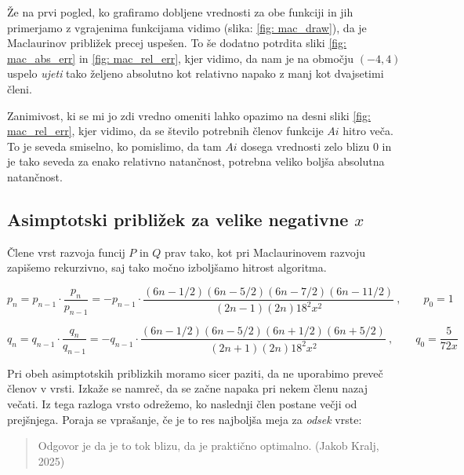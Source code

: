 \documentclass[slovene,11pt,a4paper]{article}
\begin{document}
Že na prvi pogled, ko grafiramo dobljene vrednosti za obe funkciji in jih primerjamo z vgrajenima funkcijama vidimo (slika: \ref{fig: mac_draw}), da je Maclaurinov približek precej uspešen. To še dodatno potrdita sliki \ref{fig: mac_abs_err} in \ref{fig: mac_rel_err}, kjer vidimo, da nam je na območju $(-4, 4)$ uspelo \textit{ujeti} tako željeno absolutno kot relativno napako z manj kot dvajsetimi členi.

Zanimivost, ki se mi jo zdi vredno omeniti lahko opazimo na desni sliki \ref{fig: mac_rel_err}, kjer vidimo, da se število potrebnih členov funkcije $Ai$ hitro veča. To je seveda smiselno, ko pomislimo, da tam $Ai$ dosega vrednosti zelo blizu $0$ in je tako seveda za enako relativno natančnost, potrebna veliko boljša absolutna natančnost.
\newpage



\subsection{Asimptotski približek za velike negativne $x$}

Člene vrst razvoja funcij $P$ in $Q$ prav tako, kot pri Maclaurinovem razvoju zapišemo rekurzivno, saj tako močno izboljšamo hitrost algoritma.

\begin{equation*}
  p_n = p_{n-1} \cdot \frac{p_n}{p_{n-1}} = - p_{n-1} \cdot \frac{(6n - 1/2)(6n - 5/2)(6n - 7/2)(6n - 11/2)}{(2n - 1)(2n)18^2x^2} \>, \qquad p_0 = 1
\end{equation*}

\begin{equation*}
  q_n = q_{n-1} \cdot \frac{q_n}{q_{n-1}} = - q_{n-1} \cdot \frac{(6n - 1/2)(6n - 5/2)(6n + 1/2)(6n + 5/2)}{(2n + 1)(2n)18^2x^2} \>, \qquad q_0 = \frac{5}{72x}
\end{equation*}

Pri obeh asimptotskih priblizkih moramo sicer paziti, da ne uporabimo preveč členov v vrsti. Izkaže se namreč, da se začne napaka pri nekem členu nazaj večati. Iz tega razloga vrsto odrežemo, ko naslednji člen postane večji od prejšnjega. Poraja se vprašanje, če je to res najboljša meja za \textit{odsek} vrste: 
\begin{quote}
  Odgovor je da je to tok blizu, da je praktično optimalno. (Jakob Kralj, 2025)
\end{quote}
\newpage
\end{document}
